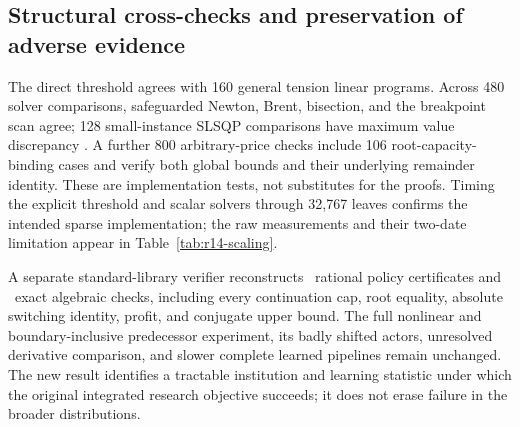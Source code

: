 \subsection{Structural cross-checks and preservation of adverse evidence}
The direct threshold agrees with 160 general tension linear programs. Across 480 solver comparisons, safeguarded Newton, Brent, bisection, and the breakpoint scan agree; 128 small-instance SLSQP comparisons have maximum value discrepancy \RFourteenDenseError. A further 800 arbitrary-price checks include 106 root-capacity-binding cases and verify both global bounds and their underlying remainder identity. These are implementation tests, not substitutes for the proofs. Timing the explicit threshold and scalar solvers through 32,767 leaves confirms the intended sparse implementation; the raw measurements and their two-date limitation appear in Table~\ref{tab:r14-scaling}.

A separate standard-library verifier reconstructs \RFourteenCertificates\ rational policy certificates and \RFourteenChecks\ exact algebraic checks, including every continuation cap, root equality, absolute switching identity, profit, and conjugate upper bound. The full nonlinear and boundary-inclusive predecessor experiment, its badly shifted actors, unresolved derivative comparison, and slower complete learned pipelines remain unchanged. The new result identifies a tractable institution and learning statistic under which the original integrated research objective succeeds; it does not erase failure in the broader distributions.
